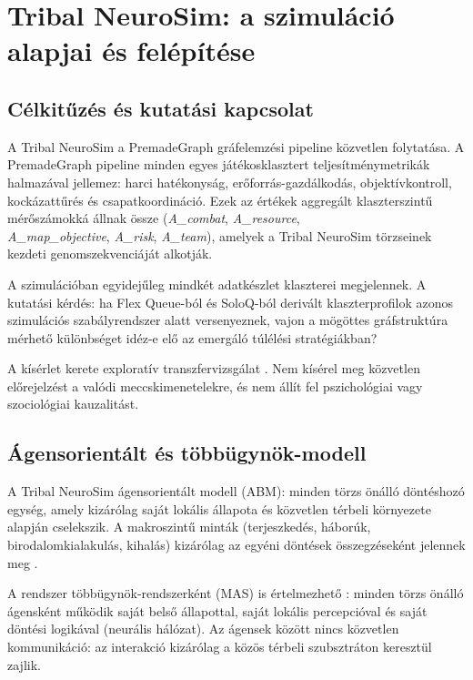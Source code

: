 \chapter{Tribal NeuroSim: a szimuláció alapjai és felépítése}

\section{Célkitűzés és kutatási kapcsolat}

A Tribal NeuroSim a PremadeGraph gráfelemzési pipeline közvetlen folytatása. A PremadeGraph pipeline minden egyes játékosklasztert teljesítménymetrikák halmazával jellemez: harci hatékonyság, erőforrás-gazdálkodás, objektívkontroll, kockázattűrés és csapatkoordináció. Ezek az értékek aggregált klaszterszintű mérőszámokká állnak össze (\textit{A\_combat}, \textit{A\_resource}, \\ \textit{A\_map\_objective}, \textit{A\_risk}, \textit{A\_team}), amelyek a Tribal NeuroSim törzseinek kezdeti genomszekvenciáját alkotják.

A szimulációban egyidejűleg mindkét adatkészlet klaszterei megjelennek. A kutatási kérdés: ha Flex Queue-ból és SoloQ-ból derivált klaszterprofilok azonos szimulációs szabályrendszer alatt versenyeznek, vajon a mögöttes gráfstruktúra mérhető különbséget idéz-e elő az emergáló túlélési stratégiákban?

A kísérlet kerete exploratív transzfervizsgálat \cite{bonabeau2002}. Nem kísérel meg közvetlen előrejelzést a valódi meccskimenetelekre, és nem állít fel pszichológiai vagy szociológiai kauzalitást.

\section{Ágensorientált és többügynök-modell}

A Tribal NeuroSim ágensorientált modell (ABM): minden törzs önálló döntéshozó egység, amely kizárólag saját lokális állapota és közvetlen térbeli környezete alapján cselekszik. A makroszintű minták (terjeszkedés, háborúk, birodalomkialakulás, kihalás) kizárólag az egyéni döntések összegzéseként jelennek meg \cite{bonabeau2002}.

A rendszer többügynök-rendszerként (MAS) is értelmezhető \cite{wooldridgejennings1995}: minden törzs önálló ágensként működik saját belső állapottal, saját lokális percepcióval és saját döntési logikával (neurális hálózat). Az ágensek között nincs közvetlen kommunikáció: az interakció kizárólag a közös térbeli szubsztráton keresztül zajlik.

